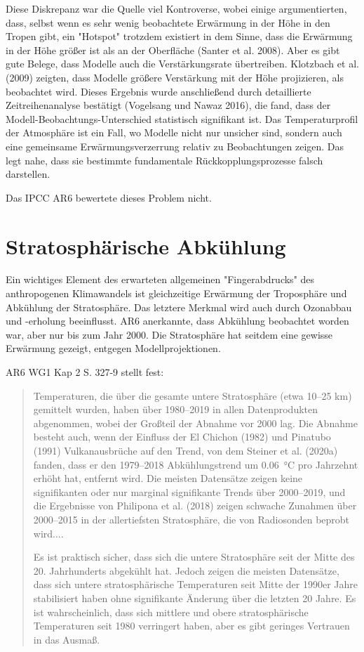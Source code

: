 \documentclass[12pt,paper=a4,DIV=12,parskip=never,chapterprefix=false,headings=standardclasses]{scrreprt}
\begin{document}
Diese Diskrepanz war die Quelle viel Kontroverse, wobei einige argumentierten, dass, selbst wenn es sehr wenig beobachtete Erwärmung in der Höhe in den Tropen gibt, ein "Hotspot" trotzdem existiert in dem Sinne, dass die Erwärmung in der Höhe größer ist als an der Oberfläche (Santer et al. 2008). Aber es gibt gute Belege, dass Modelle auch die Verstärkungsrate übertreiben. Klotzbach et al. (2009) zeigten, dass Modelle größere Verstärkung mit der Höhe projizieren, als beobachtet wird. Dieses Ergebnis wurde anschließend durch detaillierte Zeitreihenanalyse bestätigt (Vogelsang und Nawaz 2016), die fand, dass der Modell-Beobachtungs-Unterschied statistisch signifikant ist.
Das Temperaturprofil der Atmosphäre ist ein Fall, wo Modelle nicht nur unsicher sind, sondern auch eine gemeinsame Erwärmungsverzerrung relativ zu Beobachtungen zeigen. Das legt nahe, dass sie bestimmte fundamentale Rückkopplungsprozesse falsch darstellen.

Das IPCC AR6 bewertete dieses Problem nicht.


\section{Stratosphärische Abkühlung}
Ein wichtiges Element des erwarteten allgemeinen "Fingerabdrucks" des anthropogenen Klimawandels ist gleichzeitige Erwärmung der Troposphäre und Abkühlung der Stratosphäre. Das letztere Merkmal wird auch durch Ozonabbau und -erholung beeinflusst. AR6 anerkannte, dass Abkühlung beobachtet worden war, aber nur bis zum Jahr 2000. Die Stratosphäre hat seitdem eine gewisse Erwärmung gezeigt, entgegen Modellprojektionen.

AR6 WG1 Kap 2 S. 327-9 stellt fest:
\begin{quote}
Temperaturen, die über die gesamte untere Stratosphäre (etwa 10–25 km) gemittelt wurden, haben über 1980–2019 in allen Datenprodukten abgenommen, wobei der Großteil der Abnahme vor 2000 lag. Die Abnahme besteht auch, wenn der Einfluss der El Chichon (1982) und Pinatubo (1991) Vulkanausbrüche auf den Trend, von dem Steiner et al. (2020a) fanden, dass er den 1979–2018 Abkühlungstrend um \SI{0.06}{\celsius} pro Jahrzehnt erhöht hat, entfernt wird. Die meisten Datensätze zeigen keine signifikanten oder nur marginal signifikante Trends über 2000–2019, und die Ergebnisse von Philipona et al. (2018) zeigen schwache Zunahmen über 2000–2015 in der allertiefsten Stratosphäre, die von Radiosonden beprobt wird....

Es ist praktisch sicher, dass sich die untere Stratosphäre seit der Mitte des 20. Jahrhunderts abgekühlt hat. Jedoch zeigen die meisten Datensätze, dass sich untere stratosphärische Temperaturen seit Mitte der 1990er Jahre stabilisiert haben ohne signifikante Änderung über die letzten 20 Jahre. Es ist wahrscheinlich, dass sich mittlere und obere stratosphärische Temperaturen seit 1980 verringert haben, aber es gibt geringes Vertrauen in das Ausmaß.
\end{quote}
\end{document}
